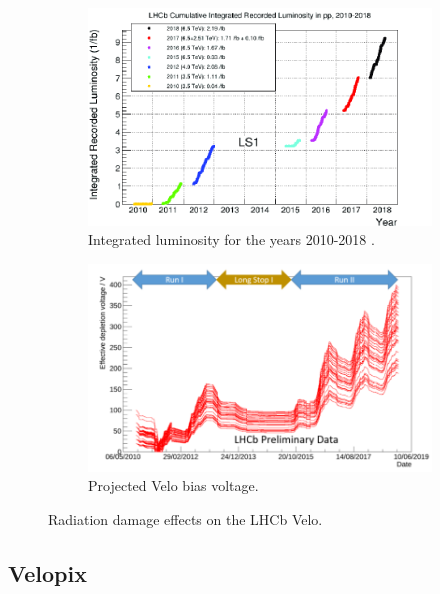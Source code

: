 \begin{figure}[H]
  \centering
\begin{subfigure}[t]{0.654\textwidth}
  \centering
  \includegraphics[width=\linewidth]{figures/chapter2/LHCb-Cumulative-Integrated-Recorded-Luminosity-in-pp-2010-2018.png}
  \caption{Integrated luminosity for the years 2010-2018 \cite{Kurbatov}.}
  \label{fig:velo_lumi}
  \end{subfigure}
\begin{subfigure}[t]{0.65\textwidth}
  \centering
  \includegraphics[width=\linewidth]{figures/chapter2/velo_strip_voltage.png}
  \caption[stripvo]{Projected Velo bias voltage.}
  \label{fig:velo_voltage}
  \end{subfigure}
  \caption[]{Radiation damage effects on the LHCb Velo.}
  \label{fig:radiation_damage}
\end{figure}


\subsection{Velopix}


